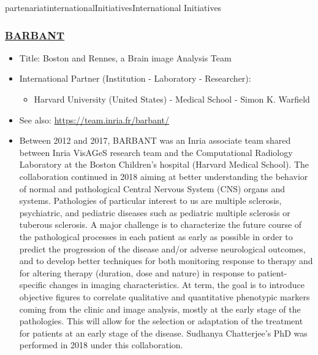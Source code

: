 \documentclass{ra2018}
\begin{document}
\begin{module}{partenariat}{internationalInitiatives}{International Initiatives}
        \subsubsection{\href{https://team.inria.fr/barbant/}{BARBANT }}
\begin{itemize}
	\item Title: Boston and Rennes, a Brain image Analysis Team
	\item International Partner (Institution -  Laboratory - Researcher):
	\begin{itemize}
		\item Harvard University (United States)  
		- Medical School - Simon K. Warfield
	\end{itemize}
	\item See also: \url{https://team.inria.fr/barbant/}
	\item Between 2012 and 2017, BARBANT was an Inria associate team shared between Inria VisAGeS research team and the Computational Radiology Laboratory at the Boston Children’s hospital (Harvard Medical School). The collaboration continued in 2018 aiming at better understanding the behavior of normal and pathological Central Nervous System (CNS) organs and systems. Pathologies of particular interest to us are multiple sclerosis, psychiatric, and pediatric diseases such as pediatric multiple sclerosis or tuberous sclerosis.
	A major challenge is to characterize the future course of the pathological processes in each patient as early as possible in order to predict the progression of the disease and/or adverse neurological outcomes, and to develop better techniques for both monitoring response to therapy and for altering therapy (duration, dose and nature) in response to patient-specific changes in imaging characteristics. At term, the goal is to introduce objective figures to correlate qualitative and quantitative phenotypic markers coming from the clinic and image analysis, mostly at the early stage of the pathologies. This will allow for the selection or adaptation of the treatment for patients at an early stage of the disease. Sudhanya Chatterjee's PhD was performed in 2018 under this collaboration.
\end{itemize}


%







\end{module}
\end{document}
